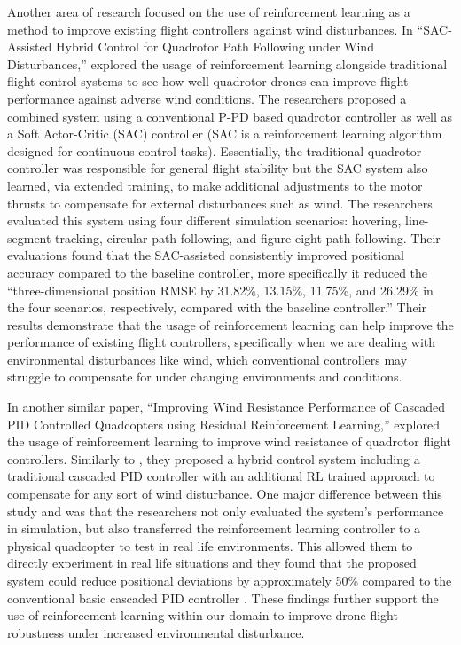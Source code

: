 \documentclass[12pt,letterpaper]{article}
\begin{document}
Another area of research focused on the use of reinforcement learning as a method to improve existing flight controllers against wind disturbances. In “SAC-Assisted Hybrid Control for Quadrotor Path Following under Wind Disturbances,” \cite{heo2026sac} explored the usage of reinforcement learning alongside traditional flight control systems to see how well quadrotor drones can improve flight performance against adverse wind conditions. The researchers proposed a combined system using a conventional P-PD based quadrotor controller as well as a Soft Actor-Critic (SAC) controller (SAC is a reinforcement learning algorithm designed for continuous control tasks). Essentially, the traditional quadrotor controller was responsible for general flight stability but the SAC system also learned, via extended training, to make additional adjustments to the motor thrusts to compensate for external disturbances such as wind. The researchers evaluated this system using four different simulation scenarios: hovering, line-segment tracking, circular path following, and figure-eight path following. Their evaluations found that the SAC-assisted consistently improved positional accuracy compared to the baseline controller, more specifically it reduced the “three-dimensional position RMSE by 31.82\%, 13.15\%, 11.75\%, and 26.29\% in the four scenarios, respectively, compared with the baseline controller.” \citep{heo2026sac} Their results demonstrate that the usage of reinforcement learning can help improve the performance of existing flight controllers, specifically when we are dealing with environmental disturbances like wind, which conventional controllers may struggle to compensate for under changing environments and conditions.

In another similar paper, “Improving Wind Resistance Performance of Cascaded PID Controlled Quadcopters using Residual Reinforcement Learning,” \cite{ishihara2023wind} explored the usage of reinforcement learning to improve wind resistance of quadrotor flight controllers. Similarly to \cite{heo2026sac}, they proposed a hybrid control system including a traditional cascaded PID controller with an additional RL trained approach to compensate for any sort of wind disturbance. One major difference between this study and \cite{heo2026sac} was that the researchers not only evaluated the system’s performance in simulation, but also transferred the reinforcement learning controller to a physical quadcopter to test in real life environments. This allowed them to directly experiment in real life situations and they found that the proposed system could reduce positional deviations by approximately 50\% compared to the conventional basic cascaded PID controller \citep{ishihara2023wind}. These findings further support the use of reinforcement learning within our domain to improve drone flight robustness under increased environmental disturbance.
\end{document}
